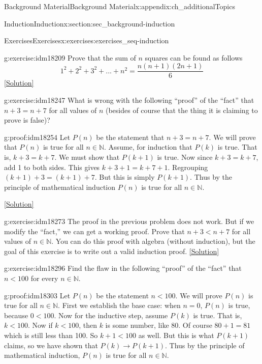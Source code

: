 \documentclass[oneside,10pt,]{book}
\numberwithin{equation}{chapter}
\def\N{\mathbb N}
\def\imp{\rightarrow}
\newcommand{\lt}{<}
\begin{document}
\begin{appendixptx}{Background Material}{}{Background Material}{}{}{x:appendix:ch_additionalTopics}
\begin{sectionptx}{Induction}{}{Induction}{}{}{x:section:sec_background-induction}
\begin{exercises-subsection}{Exercises}{}{Exercises}{}{}{x:exercises:exercises_seq-induction}
\begin{divisionexercise}{9}{}{}{g:exercise:idm18209}%
Prove that the sum of \(n\) squares can be found as follows%
\begin{equation*}
1^2 +2^2 +3^2+...+n^2 = \frac{n(n+1)(2n+1)}{6}
\end{equation*}
%
\space\hspace*{0pt}\hfill{\tiny\hyperlink{g:solution:idm18214-main}{[Solution]}}\end{divisionexercise}%
\begin{divisionexercise}{10}{}{}{g:exercise:idm18247}%
What is wrong with the following ``proof'' of the ``fact'' that \(n+3 = n+7\) for all values of \(n\) (besides of course that the thing it is claiming to prove is false)?%
\begin{proofptx}{}{g:proof:idm18254}
Let \(P(n)\) be the statement that \(n + 3 = n + 7\). We will prove that \(P(n)\) is true for all \(n \in \N\). Assume, for induction that \(P(k)\) is true. That is, \(k+3 = k+7\). We must show that \(P(k+1)\) is true. Now since \(k + 3 = k + 7\), add 1 to both sides. This gives \(k + 3 + 1 = k + 7 + 1\). Regrouping \((k+1) + 3 = (k+1) + 7\). But this is simply \(P(k+1)\). Thus by the principle of mathematical induction \(P(n)\) is true for all \(n \in \N\).%
\end{proofptx}
\space\hspace*{0pt}\hfill{\tiny\hyperlink{g:solution:idm18269-main}{[Solution]}}\end{divisionexercise}%
\begin{divisionexercise}{11}{}{}{g:exercise:idm18273}%
The proof in the previous problem does not work. But if we modify the ``fact,'' we can get a working proof. Prove that \(n + 3 \lt  n + 7\) for all values of \(n \in \N\). You can do this proof with algebra (without induction), but the goal of this exercise is to write out a valid induction proof.%
\space\hspace*{0pt}\hfill{\tiny\hyperlink{g:solution:idm18279-main}{[Solution]}}\end{divisionexercise}%
\begin{divisionexercise}{12}{}{}{g:exercise:idm18296}%
Find the flaw in the following ``proof'' of the ``fact'' that \(n \lt  100\) for every \(n \in \N\).%
\begin{proofptx}{}{g:proof:idm18303}
Let \(P(n)\) be the statement \(n \lt  100\). We will prove \(P(n)\) is true for all \(n \in \N\). First we establish the base case: when \(n = 0\), \(P(n)\) is true, because \(0 \lt  100\). Now for the inductive step, assume \(P(k)\) is true. That is, \(k \lt  100\). Now if \(k \lt  100\), then \(k\) is some number, like 80. Of course \(80+1 = 81\) which is still less than 100. So \(k +1 \lt  100\) as well. But this is what \(P(k+1)\) claims, so we have shown that \(P(k) \imp P(k+1)\). Thus by the principle of mathematical induction, \(P(n)\) is true for all \(n \in \N\).%

\end{proofptx}
\end{divisionexercise}
\end{exercises-subsection}
\end{sectionptx}
\end{appendixptx}
\end{document}
